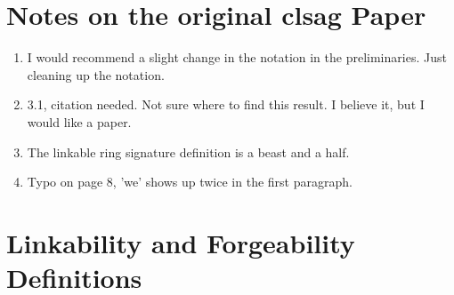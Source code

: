 \documentclass[12pt,titlepage]{article}
\begin{document}
\section{Notes on the original clsag Paper}
\begin{enumerate}
\item I would recommend a slight change in the notation in the preliminaries. Just cleaning up the notation.
\item 3.1, citation needed. Not sure where to find this result. I believe it, but I would like a paper.
\item The linkable ring signature definition is a beast and a half.
\item Typo on page 8, 'we' shows up twice in the first paragraph. 

\end{enumerate}

\section{Linkability and Forgeability Definitions}
\end{document}
